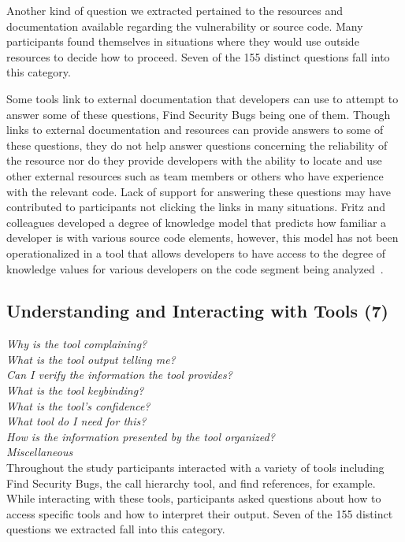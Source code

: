 \documentclass[conference]{IEEEtran}
\begin{document}
Another kind of question we extracted pertained to the resources and documentation available regarding the vulnerability or source code. 
Many participants found themselves in situations where they would use outside resources to decide how to proceed. 
Seven of the 155 distinct questions fall into this category. 

Some tools link to external documentation that developers can use to attempt to answer some of these questions, Find Security Bugs being one of them. 
Though links to external documentation and resources can provide answers to some of these questions, they do not help answer questions concerning the reliability of the resource nor do they provide developers with the ability to locate and use other external resources such as team members or others who have experience with the relevant code.
Lack of support for answering these questions may have contributed to participants not clicking the links in many situations.  
Fritz and colleagues developed a degree of knowledge model that predicts how familiar a developer is with various source code elements, however, this model has not been operationalized in a tool that allows developers to have access to the degree of knowledge values for various developers on the code segment being analyzed~\cite{fritz2010degree}.



\noindent\subsection{\textbf{Understanding and Interacting with Tools (7)}}

\noindent\emph{Why is the tool complaining?} \\
\emph{What is the tool output telling me?} \\
\emph{Can I verify the information the tool provides?} \\
\emph{What is the tool keybinding?} \\
\emph{What is the tool's confidence?} \\
\emph{What tool do I need for this?} \\
\emph{How is the information presented by the tool organized?} \\
\emph{Miscellaneous} \\

Throughout the study participants interacted with a variety of tools including Find Security Bugs, the call hierarchy tool, and find references, for example. 
While interacting with these tools, participants asked questions about how to access specific tools and how to interpret their output. 
Seven of the 155 distinct questions we extracted fall into this category.
\end{document}
